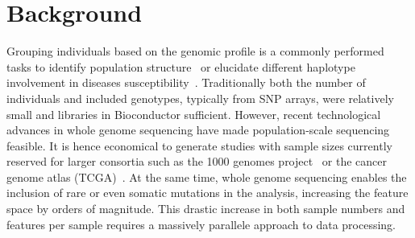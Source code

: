 \documentclass[twocolumn]{bmcart}%
\begin{document}
\begin{frontmatter}
\begin{fmbox}
\begin{abstractbox}
\begin{keyword}
\end{keyword}


\end{abstractbox}
%
\end{fmbox}%

\end{frontmatter}



\section*{Background}
Grouping individuals based on the genomic profile is a commonly performed tasks to identify population structure~\cite{Gao2007} or elucidate different haplotype involvement in diseases susceptibility~\cite{Laitman2013}.  Traditionally both the number of individuals and included genotypes, typically from SNP arrays, were relatively small and libraries in Bioconductor sufficient. However, recent technological advances in whole genome sequencing have made population-scale sequencing feasible. It is hence economical to generate studies with sample sizes currently reserved for larger consortia such as the 1000 genomes project~\cite{1KG2012} or the cancer genome atlas (TCGA)~\cite{TCGA2013}. At the same time, whole genome sequencing enables the inclusion of rare or even somatic mutations in the analysis, increasing the feature space by orders of magnitude. This drastic increase in both sample numbers and features per sample requires a massively parallele approach to data processing. 
\end{document}
